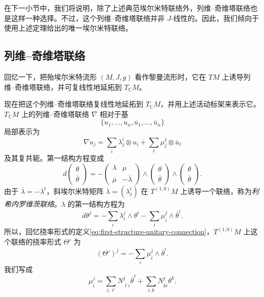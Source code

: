 在下一小节中，我们将说明，除了上述典范埃尔米特联络外，列维--奇维塔联络也是这样一种选择。不过，这个列维--奇维塔联络并非 $J$-线性的。因此，我们倾向于使用上述定理给出的唯一埃尔米特联络。

\subsection{列维--奇维塔联络}
\label{subsec:levi-civita-connection}

回忆一下，把殆埃尔米特流形 $(M,J,g)$ 看作黎曼流形时，它在 $TM$ 上诱导列维--奇维塔联络，并可复线性地延拓到 $T_{\mathbb C}M$。

现在把这个列维--奇维塔联络复线性地延拓到 $T_{\mathbb C}M$，并用上述活动标架来表示它。$T_{\mathbb C}M$ 上的列维--奇维塔联络 $\nabla$ 相对于基
\[
 \{u_1,\ldots,u_n,\overline u_1,\ldots,\overline u_n\}
\]
局部表示为
\[
 \nabla u_j=\sum_i\lambda_j^i\otimes u_i
 +\sum_\ell\mu_j^{\overline\ell}\otimes\overline u_\ell
\]
及其复共轭。第一结构方程变成
\begin{equation}
 d\begin{pmatrix}\theta\\ \overline\theta\end{pmatrix}
 =-\begin{pmatrix}\lambda&\mu\\ \overline\mu&-\overline\lambda\end{pmatrix}
 \wedge\begin{pmatrix}\theta\\ \overline\theta\end{pmatrix}
 \wedge\begin{pmatrix}\theta\\ \overline\theta\end{pmatrix}.
 \label{eq:levi-civita-first-structure-source}
\end{equation}
由于 $\overline\lambda=-\lambda^t$，斜埃尔米特矩阵
$\lambda=(\lambda_j^i)$ 在 $T^{(1,0)}M$ 上诱导一个联络，称为\emph{利希内罗维茨联络}。$\lambda$ 的第一结构方程为
\[
 d\theta^j=-\sum_i\lambda_i^j\wedge\theta^i
 -\sum_i\mu_{\overline i}^{j}\wedge\overline\theta^i.
\]
所以，回忆挠率形式的定义\eqref{eq:first-structure-unitary-connection}，$T^{(1,0)}M$ 上这个联络的挠率形式 $\Theta'$ 为
\begin{equation}
 (\Theta')^j=-\sum_i\mu_{\overline i}^{j}\wedge\overline\theta^i.
 \label{eq:lichnerowitz-torsion}
\end{equation}
我们写成
\[
 \mu_{\overline i}^{j}
 =\sum_{i,\ell}N_{\overline\ell\overline i}^{j}\overline\theta^\ell
 +\sum_{i,k}N_{k\overline i}^{j}\theta^k.
\]

